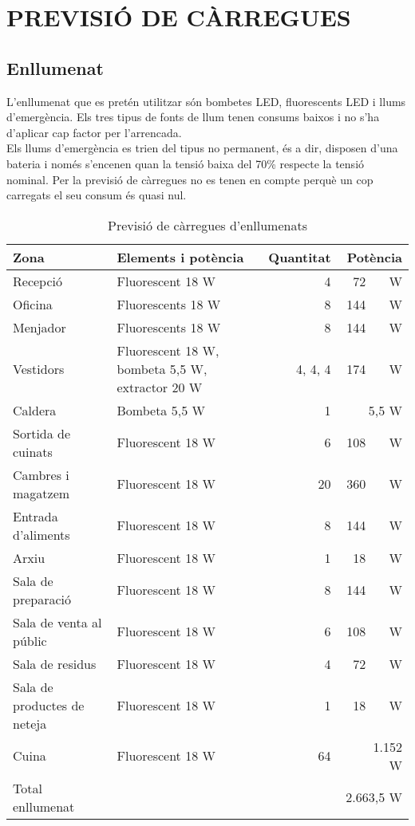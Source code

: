 \chapter{\uppercase{Previsió de càrregues}}
\section{Enllumenat}
L'enllumenat que es pretén utilitzar són bombetes LED, fluorescents LED i llums d'emergència. Els tres tipus de fonts de llum tenen consums baixos i no s'ha d'aplicar cap factor per l'arrencada.\\
\newline Els llums d'emergència es trien del tipus no permanent, és a dir, disposen d'una bateria i només s'encenen quan la tensió baixa del 70\% respecte la tensió nominal.  Per la previsió de càrregues no es tenen en compte perquè un cop carregats el seu consum és quasi nul.
\begin{table}[H]
\small
\begin{center}
 \begin{tabularx}{\textwidth}{|l|X|r|r|}%
 \hline
 Zona & Elements i potència & Quantitat & Potència \\
 \hline
 Recepció & Fluorescent 18 W & 4 & 72 \ \ \ W\\
 Oficina & Fluorescents 18 W & 8 & 144 \ \ \ W\\
 Menjador & Fluorescents 18 W & 8 & 144 \ \ \ W\\
 Vestidors & Fluorescent 18 W, bombeta 5,5 W, extractor 20 W & 4, 4, 4 & 174 \ \ \ W\\
 Caldera & Bombeta 5,5 W & 1 & 5,5 W\\
 Sortida de cuinats & Fluorescent 18 W & 6 & 108 \ \ \ W\\
 Cambres i magatzem & Fluorescent 18 W & 20 & 360 \ \ \ W\\
 Entrada d'aliments & Fluorescent 18 W & 8 & 144 \ \ \ W\\
 Arxiu & Fluorescent 18 W & 1 & 18 \ \ \ W\\
 Sala de preparació & Fluorescent 18 W & 8 & 144 \ \ \ W\\
 Sala de venta al públic & Fluorescent 18 W & 6 & 108 \ \ \ W\\
 Sala de residus & Fluorescent 18 W & 4 & 72 \ \ \ W\\
 Sala de productes de neteja & Fluorescent 18 W & 1 & 18 \ \ \ W\\
 Cuina & Fluorescent 18 W & 64 & 1.152 \ \ \ W\\
 
  

 \hline
 Total enllumenat & & & 2.663,5 W\\
 \hline
 \end{tabularx}
 \caption{Previsió de càrregues d'enllumenats}
\end{center}
\end{table}
%
%
%
%
%
